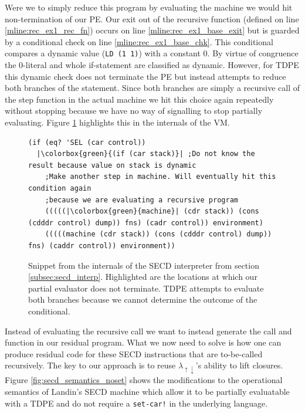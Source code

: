 \documentclass[a4paper,12pt,twoside,openright]{report}
\theoremstyle{definition}
\newcommand{\mslang}{$\lambda_{\uparrow\downarrow}$}
\begin{document}
Were we to simply reduce this program by evaluating the machine we would hit non-termination of our PE. Our exit out of the recursive function (defined on line \ref{mline:rec_ex1_rec_fn}) occurs on line \ref{mline:rec_ex1_base_exit} but is guarded by a conditional check on line \ref{mline:rec_ex1_base_chk}. This conditional compares a dynamic value (\texttt{LD (1 1)}) with a constant 0. By virtue of congruence the 0-literal and whole if-statement are classified as dynamic. However, for TDPE this dynamic check does not terminate the PE but instead attempts to reduce both branches of the statement. Since both branches are simply a recursive call of the step function in the actual machine we hit this choice again repeatedly without stopping because we have no way of signalling to stop partially evaluating. Figure \ref{lst:secd_recursion_machine_ex1} highlights this in the internals of the VM.

\begin{figure}[ht!]
\begin{verbatim}
(if (eq? 'SEL (car control))
  |\colorbox{green}{(if (car stack)}| ;Do not know the result because value on stack is dynamic
    ;Make another step in machine. Will eventually hit this condition again
    ;because we are evaluating a recursive program
    (((((|\colorbox{green}{machine}| (cdr stack)) (cons (cdddr control) dump)) fns) (cadr control)) environment)
    (((((machine (cdr stack)) (cons (cdddr control) dump)) fns) (caddr control)) environment))
\end{verbatim}
\caption{Snippet from the internals of the SECD interpreter from section \ref{subsec:secd_interp}. Highlighted are the locations at which our partial evaluator does not terminate. TDPE attempts to evaluate both branches because we cannot determine the outcome of the conditional.}
\label{lst:secd_recursion_machine_ex1}
\end{figure}

Instead of evaluating the recursive call we want to instead generate the call and function in our residual program. What we now need to solve is how one can produce residual code for these SECD instructions that are to-be-called recursively. The key to our approach is to reuse \mslang's ability to lift closures. Figure \ref{fig:secd_semantics_noset} shows the modifications to the operational semantics of Landin's SECD machine \cite{landin1964mechanical} which allow it to be partially evaluatable with a TDPE and do not require a \texttt{set-car!} in the underlying language.
\end{document}

